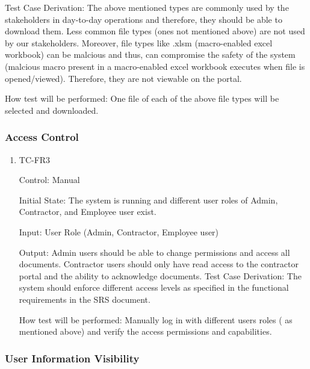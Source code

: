 \documentclass[12pt, titlepage]{article}
\begin{document}
\begin{enumerate}
    Test Case Derivation: The above mentioned types are commonly used by the
    stakeholders in day-to-day operations and therefore, they should be able to
    download them. Less common file types (ones not mentioned above)
    are not used by
    our stakeholders. Moreover, file types like .xlsm (macro-enabled excel
    workbook) can be malcious and thus, can compromise the safety of the system
    (malcious macro present in a macro-enabled excel workbook executes when file
    is opened/viewed). Therefore, they are not viewable on the portal.

    How test will be performed: One file of each of the above file
    types  will be selected and downloaded.

\end{enumerate}

\subsubsection{Access Control}

\begin{enumerate}
  \item {TC-FR3\\}

    Control: Manual

    Initial State: The system is running and different user roles of Admin,
    Contractor, and Employee user exist.

    Input: User Role (Admin, Contractor, Employee user)

    Output: Admin users should be able to change permissions and access all
    documents. Contractor users should only have read access to the
    contractor portal and the
    ability to acknowledge documents.
    Test Case Derivation: The system should enforce different access levels as
    specified in the functional requirements in the SRS document.

    How test will be performed: Manually log in with different users roles (
    as mentioned above) and verify the access permissions and capabilities.

\end{enumerate}

\subsubsection{User Information Visibility}
\end{document}
